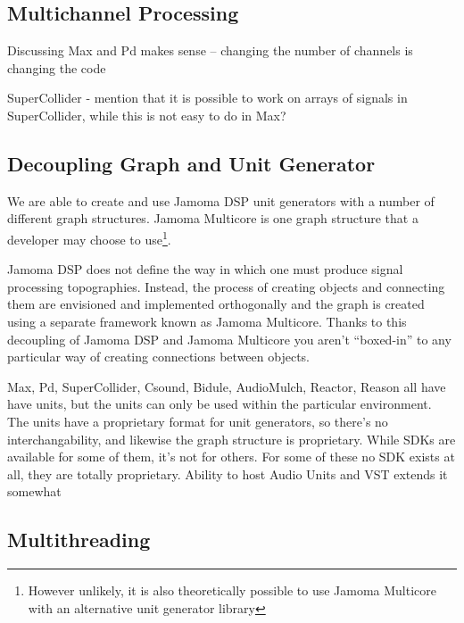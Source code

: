 \documentclass[twoside,a4paper]{article}
\begin{document}


\subsection{Multichannel Processing} %

Discussing Max and Pd makes sense -- changing the number of channels is changing the code

SuperCollider - mention that it is possible to work on arrays of signals in SuperCollider, while this is not easy to do in Max?




\subsection{Decoupling Graph and Unit Generator} %

We are able to create and use Jamoma DSP unit generators with a number of different graph structures.  Jamoma Multicore is one graph structure that a developer may choose to use\footnote{However unlikely, it is also theoretically possible to use Jamoma Multicore with an alternative unit generator library}.

Jamoma DSP does not define the way in which one must produce signal processing topographies.  Instead, the process of creating objects and connecting them are envisioned and implemented orthogonally and the graph is created using a separate framework known as Jamoma Multicore.  Thanks to this decoupling of Jamoma DSP and Jamoma Multicore you aren't ``boxed-in'' to any particular way of creating connections between objects.

Max, Pd, SuperCollider, Csound, Bidule, AudioMulch, Reactor, Reason all have have units, but the units can only be used within the particular environment. The units have a proprietary format for unit generators, so there's no interchangability, and likewise the graph structure is proprietary. While SDKs are available for some of them, it's not for others. For some of these no SDK exists at all, they are totally proprietary. Ability to host Audio Units and VST extends it somewhat



\subsection{Multithreading} %
\end{document}
